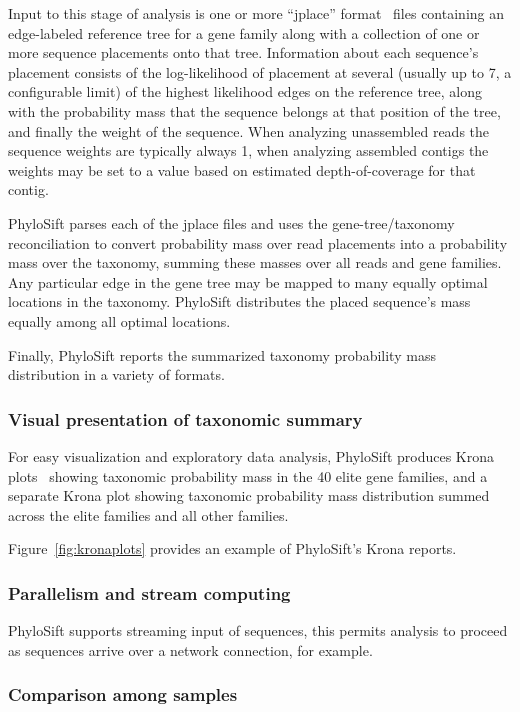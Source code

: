 \documentclass[10pt]{article}
\begin{document}
Input to this stage of analysis is one or more ``jplace'' format~\cite{matsen2012format} files containing an edge-labeled reference tree for a gene family along with a collection of one or more sequence placements onto that tree.
Information about each sequence's placement consists of the log-likelihood of placement at several (usually up to 7, a configurable limit) of the highest likelihood edges on the reference tree, along with the probability mass that the sequence belongs at that position of the tree, and finally the weight of the sequence.
When analyzing unassembled reads the sequence weights are typically always 1, when analyzing assembled contigs the weights may be set to a value based on estimated depth-of-coverage for that contig.

PhyloSift parses each of the jplace files and uses the gene-tree/taxonomy reconciliation to convert probability mass over read placements into a probability mass over the taxonomy, summing these masses over all reads and gene families.
Any particular edge in the gene tree may be mapped to many equally optimal locations in the taxonomy.
PhyloSift distributes the placed sequence's mass equally among all optimal locations.

Finally, PhyloSift reports the summarized taxonomy probability mass distribution in a variety of formats.

\subsubsection*{Visual presentation of taxonomic summary}

For easy visualization and exploratory data analysis, PhyloSift produces Krona plots~\cite{Ondov2011} showing taxonomic probability mass in the 40 elite gene families, and a separate Krona plot showing taxonomic probability mass distribution summed across the elite families and all other families.

Figure~\ref{fig:kronaplots} provides an example of PhyloSift's Krona reports.

\subsubsection*{Parallelism and stream computing}

PhyloSift supports streaming input of sequences, this permits analysis to proceed as sequences arrive over a network connection, for example.

\subsubsection*{Comparison among samples}
\end{document}
